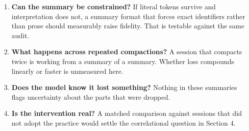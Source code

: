 \documentclass[11pt]{article}
\begin{document}
\begin{enumerate}
  \item \textbf{Can the summary be constrained?} If literal tokens survive and
        interpretation does not, a summary format that forces exact identifiers
        rather than prose should measurably raise fidelity. That is testable
        against the same audit.
  \item \textbf{What happens across repeated compactions?} A session that
        compacts twice is working from a summary of a summary. Whether loss
        compounds linearly or faster is unmeasured here.
  \item \textbf{Does the model know it lost something?} Nothing in these
        summaries flags uncertainty about the parts that were dropped.
  \item \textbf{Is the intervention real?} A matched comparison against sessions
        that did not adopt the practice would settle the correlational question
        in Section 4.
\end{enumerate}
\end{document}
